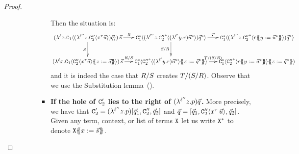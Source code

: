 \begin{proof}
\begin{enumerate}
\begin{enumerate}
\begin{enumerate}
\begin{itemize}
        Then the situation is:
        {\tiny
        \[
          \xymatrix@C=.5cm{
            (\lamp{\lab}{\var}{\con_1\of{  (\lamp{\labthree}{\varthree}{\con''_2\of{\var^{\typ}\ls{\tmthree}} })\ls{\tmsix} }})\,\ls{\tmtwo}
            \ar[r]^-{\redex}
            \ar[d]_-{\redextwo}
          &
            \con_1^*\of{  (\lamp{\labthree}{\varthree}{{\con''_2}^*\of{(\lamp{\labtwo}{\vartwo}{\tmfour})\ls{\tmthree}^*} })\ls{\tmsix}^* }
            \ar[d]_-{\redextwo/\redex}
            \ar[r]^-{\redexthree}
          &
            \con_1^*\of{  (\lamp{\labthree}{\varthree}{{\con''_2}^*\of{ \tmfour\sub{\vartwo}{\ls{\tmthree}^*} } })\ls{\tmsix}^* }
          \\
            (\lamp{\lab}{\var}{\con_1\of{  \con''_2\of{\var^{\typ}\ls{\tmthree}} \sub{\varthree}{\ls{\tmsix}} }})\,\ls{\tmtwo}
            \ar[r]^-{\redex/\redextwo}
          &
            \con_1^*\of{  {\con''_2}^*\of{(\lamp{\labtwo}{\vartwo}{\tmfour})\ls{\tmthree}^*} \sub{\varthree}{\ls{\tmsix}^*} }
            \ar[r]^-{\redexthree/(\redextwo/\redex)}
          &
            \con_1^*\of{  {\con''_2}^*\of{ \tmfour\sub{\vartwo}{\ls{\tmthree}^*} } \sub{\varthree}{\ls{\tmsix}^*} }
          }
        \]}
        and it is indeed the case that $R/S$ creates $T/(S/R)$.
        Observe that we use the Substitution lemma~().
      \item {\bf If the hole of $\mathtt{C}'_2$ lies to the right of $(\lambda^{\ell''} z. p)\vec{q}$.}
        More precisely, we have that $\mathtt{C}'_2 = (\lambda^{\ell''} z. p)[\vec{q}_1,\mathtt{C}''_2,\vec{q}_2]$
        and $\vec{q} = [\vec{q}_1,\mathtt{C}''_2\langle x^\tau\,\vec{u}\rangle,\vec{q}_2]$.
        Given any term, context, or list of terms $\mathtt{X}$ let us write $\mathtt{X}^*$ to denote $\mathtt{X}\{\!\!\{x := \vec{s}\}\!\!\}$.


\end{itemize}
\end{enumerate}
\end{enumerate}
\end{enumerate}
\end{proof}
